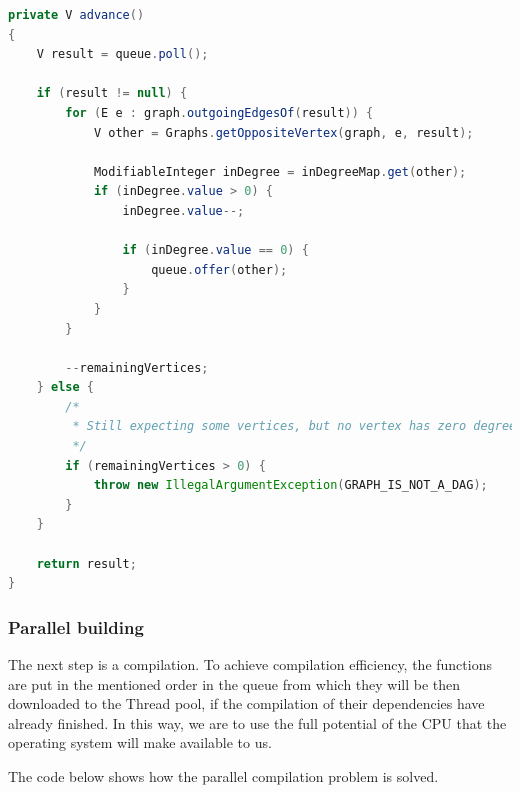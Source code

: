 \begin{lstlisting}[language=Java, frame=single]
private V advance()
{
    V result = queue.poll();

    if (result != null) {
        for (E e : graph.outgoingEdgesOf(result)) {
            V other = Graphs.getOppositeVertex(graph, e, result);

            ModifiableInteger inDegree = inDegreeMap.get(other);
            if (inDegree.value > 0) {
                inDegree.value--;

                if (inDegree.value == 0) {
                    queue.offer(other);
                }
            }
        }

        --remainingVertices;
    } else {
        /*
         * Still expecting some vertices, but no vertex has zero degree.
         */
        if (remainingVertices > 0) {
            throw new IllegalArgumentException(GRAPH_IS_NOT_A_DAG);
        }
    }

    return result;
}
\end{lstlisting}

\hypertarget{parallel-building}{%
\subsubsection{Parallel building}\label{parallel-building}}

The next step is a compilation. To achieve compilation efficiency, the
functions are put in the mentioned order in the queue from which they
will be then downloaded to the Thread pool, if the compilation of their
dependencies have already finished. In this way, we are to use the full
potential of the CPU that the operating system will make available to
us.

The code below shows how the parallel compilation problem is solved.

